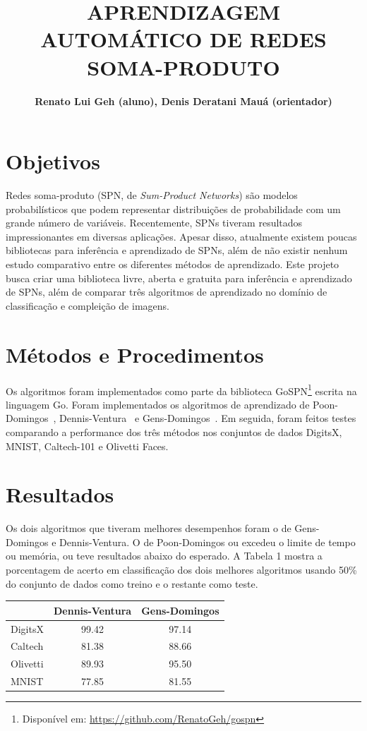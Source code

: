 \documentclass[10pt,a4paper]{article}
\title{APRENDIZAGEM AUTOMÁTICO DE REDES SOMA-PRODUTO}
\author{\textbf{Renato Lui Geh (aluno), Denis Deratani Mauá (orientador)}}
\affil{Instituto de Matemática e Estatística, Universidade de São Paulo}
\affil{\fontsize{10pt}{12}\selectfont\{renatolg,ddm\}@ime.usp.br}
\date{}
\begin{document}
\maketitle

\begin{multicols*}{2}

\section*{Objetivos}

Redes soma-produto (SPN, de \textit{Sum-Product Networks}) são modelos probabilísticos que podem
representar distribuições de probabilidade com um grande número de variáveis.  Recentemente, SPNs
tiveram resultados impressionantes em diversas aplicações.  Apesar disso, atualmente existem poucas
bibliotecas para inferência e aprendizado de SPNs, além de não existir nenhum estudo comparativo
entre os diferentes métodos de aprendizado.  Este projeto busca criar uma biblioteca livre, aberta
e gratuita para inferência e aprendizado de SPNs, além de comparar três algoritmos de aprendizado
no domínio de classificação e compleição de imagens.

\section*{Métodos e Procedimentos}

Os algoritmos foram implementados como parte da biblioteca GoSPN\footnote{Disponível em:
  \url{https://github.com/RenatoGeh/gospn}} escrita na linguagem Go.  Foram implementados os
algoritmos de aprendizado de Poon-Domingos~\cite{poon-domingos}, Dennis-Ventura~\cite{clustering} e
Gens-Domingos~\cite{gens-domingos}. Em seguida, foram feitos testes comparando a performance dos
três métodos nos conjuntos de dados DigitsX, MNIST, Caltech-101 e Olivetti Faces.

\section*{Resultados}

Os dois algoritmos que tiveram melhores desempenhos foram o de Gens-Domingos e Dennis-Ventura. O de
Poon-Domingos ou excedeu o limite de tempo ou memória, ou teve resultados abaixo do esperado. A
Tabela 1 mostra a porcentagem de acerto em classificação dos dois melhores algoritmos usando 50\%
do conjunto de dados como treino e o restante como teste.
\vspace{-0.2cm}
\begin{tabular}{l|c|c}
  & Dennis-Ventura & Gens-Domingos\\
  \hline
  DigitsX & 99.42 & 97.14\\
  Caltech & 81.38 & 88.66\\
  Olivetti& 89.93 & 95.50\\
  MNIST   & 77.85 & 81.55\\
\end{tabular}


\end{multicols*}
\end{document}
